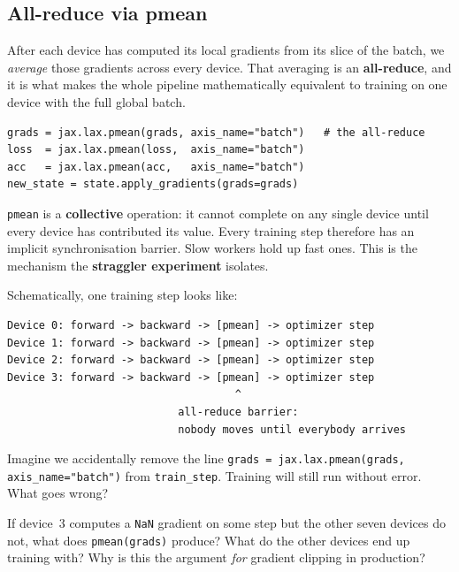 \documentclass[11pt,a4paper]{article}
\newcounter{exercise}[section]
\newcommand{\answerspace}[1][3]{\vspace{#1\baselineskip}}
\newcommand{\stars}[1]{\textbf{\small(#1)}}
\begin{document}
\subsection{All-reduce via pmean}

After each device has computed its local gradients from its slice of the batch, we
\emph{average} those gradients across every device. That averaging is an \textbf{all-reduce},
and it is what makes the whole pipeline mathematically equivalent to training on one device
with the full global batch.

\begin{lstlisting}[style=py]
grads = jax.lax.pmean(grads, axis_name="batch")   # the all-reduce
loss  = jax.lax.pmean(loss,  axis_name="batch")
acc   = jax.lax.pmean(acc,   axis_name="batch")
new_state = state.apply_gradients(grads=grads)
\end{lstlisting}

\begin{keypoint}
\texttt{pmean} is a \textbf{collective} operation: it cannot complete on any single device
until every device has contributed its value. Every training step therefore has an implicit
synchronisation barrier. Slow workers hold up fast ones. This is the mechanism the
\textbf{straggler experiment} isolates.
\end{keypoint}

Schematically, one training step looks like:

\begin{lstlisting}[style=sh]
Device 0: forward -> backward -> [pmean] -> optimizer step
Device 1: forward -> backward -> [pmean] -> optimizer step
Device 2: forward -> backward -> [pmean] -> optimizer step
Device 3: forward -> backward -> [pmean] -> optimizer step
                                    ^
                           all-reduce barrier:
                           nobody moves until everybody arrives
\end{lstlisting}

\begin{exercise}[Forget the pmean? \stars{3}]
Imagine we accidentally remove the line \texttt{grads = jax.lax.pmean(grads, axis\_name="batch")}
from \texttt{train\_step}. Training will still run without error. What goes wrong?
\answerspace[3]
\end{exercise}

\begin{exercise}[NaN on one device, \stars{3}]
If device~3 computes a \texttt{NaN} gradient on some step but the other seven devices do not,
what does \texttt{pmean(grads)} produce? What do the other devices end up training with?
Why is this the argument \emph{for} gradient clipping in production?
\answerspace[3]
\end{exercise}
\end{document}
